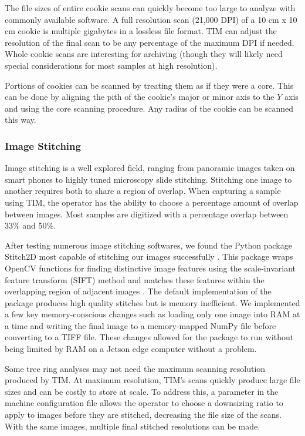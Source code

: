 \documentclass[a4paper,12pt]{article}
\begin{document}
The file sizes of entire cookie scans can quickly become too large to analyze with commonly available software. A full resolution scan (21,000 DPI) of a 10 cm x 10 cm cookie is multiple gigabytes in a lossless file format. 
TIM can adjust the resolution of the final scan to be any percentage of the maximum DPI if needed. Whole cookie scans are interesting for archiving (though they will likely need special considerations for most samples at high resolution). 

Portions of cookies can be scanned by treating them as if they were a core. This can be done by aligning the pith of the cookie's major or minor axis to the $Y$ axis and using the core scanning procedure. Any radius of the cookie can be scanned this way.

\subsubsection{Image Stitching}

Image stitching is a well explored field, ranging from panoramic images taken on smart phones to highly tuned microscopy slide stitching. 
Stitching one image to another requires both to share a region of overlap. When capturing a sample using TIM, the operator has the ability to choose a percentage amount of overlap between images.
Most samples are digitized with a percentage overlap between 33\% and 50\%.

After testing numerous image stitching softwares, we found the Python package Stitch2D most capable of stitching our images successfully \citep{mansur_stitch2d_2022}. %
This package wraps OpenCV functions for finding distinctive image features using the scale-invariant feature transform (SIFT) method and matches these features within the overlapping region of adjacent images \citep{lowe_distinctive_2004}. 
The default implementation of the package produces high quality stitches but is memory inefficient. %
We implemented a few key memory-conscious changes such as loading only one image into RAM at a time and writing the final image to a memory-mapped NumPy file before converting to a TIFF file. These changes allowed for the package to run without being limited by RAM on a Jetson edge computer without a problem.

Some tree ring analyses may not need the maximum scanning resolution produced by TIM. At maximum resolution, TIM's scans quickly produce large file sizes and can be costly to store at scale. 
To address this, a parameter in the machine configuration file allows the operator to choose a downsizing ratio to apply to images before they are stitched, decreasing the file size of the scans.
With the same images, multiple final stitched resolutions can be made. 
\end{document}
